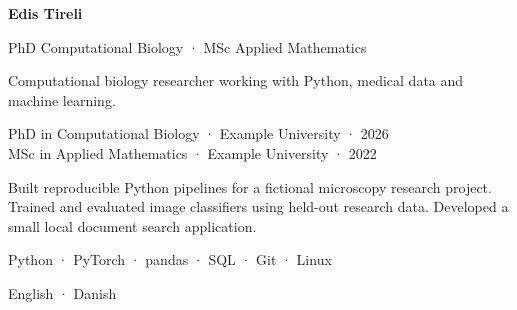 \documentclass[11pt,a4paper]{article}
\begin{document}
{\fontsize{34}{38}\selectfont\bfseries Edis Tireli}\par\vspace{1mm}
{\small\color{muted}PhD Computational Biology · MSc Applied Mathematics}\par

\par

\vspace{4mm}{\color{muted}\hrule}\vspace{6mm}
Computational biology researcher working with Python, medical data and machine learning.\par
\vspace{3mm}
\par{}\par\nopagebreak
PhD in Computational Biology · Example University · 2026\\
MSc in Applied Mathematics · Example University · 2022

\par{}\par\nopagebreak
Built reproducible Python pipelines for a fictional microscopy research project. Trained and evaluated image classifiers using held-out research data. Developed a small local document search application.

\par{}\par\nopagebreak
Python · PyTorch · pandas · SQL · Git · Linux

\par{}\par\nopagebreak
English · Danish
\vfill\vspace{8mm}\par
\end{document}
